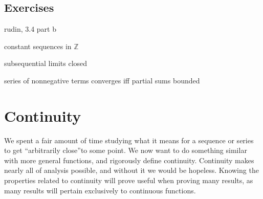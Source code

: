 \documentclass{article}
\newcommand{\Z}{\mathbb{Z}}
\theoremstyle{definition}
\begin{document}
\subsection{Exercises}
rudin, 3.4 part b

constant sequences in $ \Z $

subsequential limits closed

series of nonnegative terms converges iff partial sums bounded
\newpage
\section{Continuity}
We spent a fair amount of time studying what it means for a sequence or series to get ``arbitrarily close''to some point. We now want to do something similar with more general functions, and rigorously define continuity. Continuity makes nearly all of analysis possible, and without it we would be hopeless. Knowing the properties related to continuity will prove useful when proving many results, as many results will pertain exclusively to continuous functions. 
\end{document}
